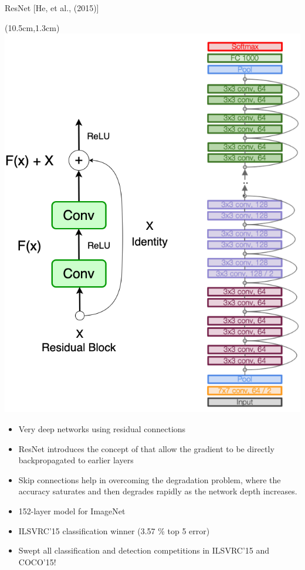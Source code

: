 \documentclass[serif, aspectratio=169]{beamer}
\begin{document}
\begin{frame}{ResNet [He, et al., (2015)]}
	
	\begin{textblock*}{5cm}(10.5cm,1.3cm) %
		\includegraphics[keepaspectratio, scale=0.23]{pic/resBlock}
	\end{textblock*}
	
	\begin{itemize}
		\item \color{red} Very deep networks using residual connections
		\item \color{blue} ResNet introduces the concept of \color{red}{skip connections \newline (or residual connections)} \color{blue} that allow the gradient to \newline be directly backpropagated to earlier layers
		\item \color{blue} Skip connections help in overcoming the degradation \newline problem, where the accuracy saturates and then \newline degrades rapidly as the network depth increases.
		\item \color{blue} 152-layer model for ImageNet
		\item \color{blue} ILSVRC’15 classification winner (3.57 \% top 5 error)
		\item \color{blue} Swept all classification and detection competitions \newline in ILSVRC’15 and COCO’15!
	\end{itemize}
\end{frame}
\end{document}
